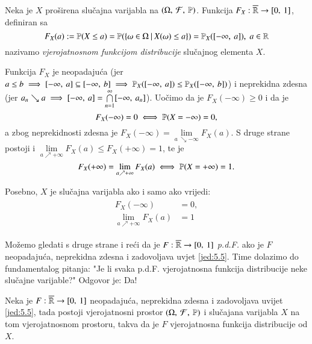 \begin{defn}    \label{defn:5.4}
    Neka je $X$ pro\v sirena slu\v cajna varijabla na $(\Omega, \: \mathcal{F}, \: \mathbb{P})$.
    Funkcija $F_X : \overline{\mathbb{R}} \to [{0}, \:{1}]$, definiran sa
    \begin{equation*}
        F_X (a) := \mathbb{P} (X \leq a) = \mathbb{P} (\{{\omega \in \Omega} \: | \: {X(\omega) \leq a}\}) = \mathbb{P}_X ([{-\infty}, \:{a}]), \; a \in \mathbb{R}
    \end{equation*}
    nazivamo \emph{vjerojatnosnom funkcijom distribucije} slu\v cajnog elementa $X$.
\end{defn}

Funkcija $F_X$ je neopadaju\' ca (jer $a \leq b \implies [{-\infty}, \:{a}] \subseteq [{-\infty}, \:{b}] \implies \mathbb{P}_X ([{-\infty}, \:{a}]) \leq \mathbb{P}_X ([{-\infty}, \:{b}]) $) i neprekidna zdesna (jer $a_n \searrow a \implies [{-\infty}, \:{a}] = \bigcap\limits_{n = 1}^{\infty} [{-\infty}, \:{a_n}]$).
Uo\v cimo da je $F_X (-\infty) \geq 0$ i da je
\begin{equation*}
    F_X (-\infty) = 0 \iff \mathbb{P} (X = -\infty) = 0,
\end{equation*}
a zbog neprekidnosti zdesna je $F_X (-\infty) = \lim\limits_{a \ \searrow -\infty} F_X (a)$.
S druge strane postoji i $\lim\limits_{a \nearrow +\infty} F_X (a) \leq F_X(+\infty) = 1$, te je
\begin{equation*}
    F_X(+\infty) = \lim\limits_{a \nearrow +\infty} F_X (a) \iff \mathbb{P} (X = +\infty) = 1.
\end{equation*}

Posebno, $X$ je slu\v cajna varijabla ako i samo ako vrijedi:
\begin{align}    \label{jed:5.5}
    \begin{split}
        F_X(-\infty) &= 0, \\
        \lim\limits_{a \nearrow +\infty} F_X(a) &= 1
    \end{split}
\end{align}

Mo\v zemo gledati s druge strane i re\' ci da je $F: \overline{\mathbb{R}} \to [{0}, \:{1}]$ \emph{p.d.F.} ako je $F$ neopadaju\' ca, neprekidna zdesna i zadovoljava uvjet \eqref{jed:5.5}.
Time dolazimo do fundamentalog pitanja: "Je li svaka p.d.F. vjerojatnosna funkcija distribucije neke slu\v cajne varijable?"
Odgovor je: Da!

\begin{tm}  \label{tm:5.6}
    Neka je $F: \overline{\mathbb{R}} \to [{0}, \:{1}]$ neopadaju\' ca, neprekidna zdesna i zadovoljava uvijet \eqref{jed:5.5}, tada postoji vjerojatnosni prostor $(\Omega, \: \mathcal{F}, \: \mathbb{P})$ i slu\v cajana varijabla $X$ na tom vjerojatnosnom prostoru, takva da je $F$ vjerojatnosna funkcija distribucije od $X$.
\end{tm}

